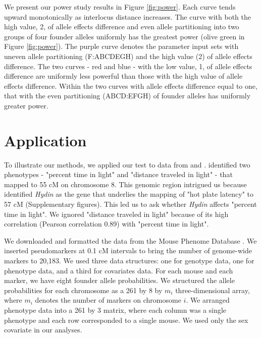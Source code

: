 \documentclass[12pt,twoside, lineno]{gsajnl}
\begin{document}
We present our power study results in Figure \ref{fig:power}. Each curve tends upward monotonically as interlocus distance increases. The curve with both the high value, 2, of allele effects difference and even allele partitioning into two groups of four founder alleles uniformly has the greatest power (olive green in Figure \ref{fig:power}). The purple curve denotes the parameter input sets with uneven allele partitioning (F:ABCDEGH) and the high value (2) of allele effects difference. The two curves - red and blue - with the low value, 1, of allele effects difference are uniformly less powerful than those with the high value of allele effects difference. Within the two curves with allele effects difference equal to one, that with the even partitioning (ABCD:EFGH) of founder alleles has uniformly greater power. 


\section{Application}
\label{sec:app}

To illustrate our methods, we applied our test to data from \citet{logan2013high} and \citet{recla2014precise}. \citet{logan2013high} identified two phenotypes - "percent time in light" and "distance traveled in light" - that mapped to 55 cM on chromosome 8. This genomic region intrigued us because \citet{recla2014precise} identified \textit{Hydin} as the gene that underlies the mapping of "hot plate latency" to 57 cM (Supplementary figures). This led us to ask whether \textit{Hydin} affects "percent time in light". We ignored "distance traveled in light" because of its high correlation (Pearson correlation 0.89) with "percent time in light". 




We downloaded and formatted the data from the Mouse Phenome Database \citep{bogue2015collaborative}. We inserted pseudomarkers at 0.1 cM intervals to bring the number of genome-wide markers to 20,183. We used three data structures: one for genotype data, one for phenotype data, and a third for covariates data. For each mouse and each marker, we have eight founder allele probabilities. We structured the allele probabilities for each chromosome as a 261 by 8 by $m_i$ three-dimensional array, where $m_i$ denotes the number of markers on chromosome $i$. We arranged phenotype data into a 261 by 3 matrix, where each column was a single phenotype and each row corresponded to a single mouse. We used only the sex covariate in our analyses. 
\end{document}
